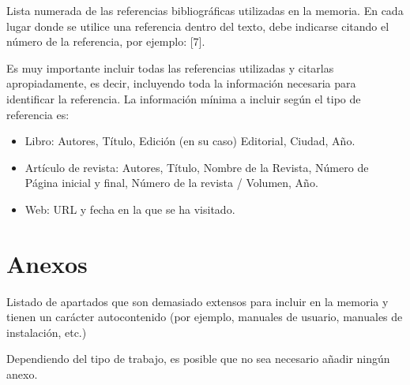 \documentclass{uoc_memoria}
\begin{document}
\begin{guidancebox}
Lista numerada de las referencias bibliográficas utilizadas en la memoria. En cada lugar donde se utilice una referencia dentro del texto, debe indicarse citando el número de la referencia, por ejemplo: [7].

Es muy importante incluir todas las referencias utilizadas y citarlas apropiadamente, es decir, incluyendo toda la información necesaria para identificar la referencia. La información mínima a incluir según el tipo de referencia es:

\begin{itemize}
  \item Libro: Autores, Título, Edición (en su caso) Editorial, Ciudad, Año.
  \item Artículo de revista: Autores, Título, Nombre de la Revista, Número de Página inicial y final, Número de la revista / Volumen, Año.
  \item Web: URL y fecha en la que se ha visitado.
\end{itemize}
\end{guidancebox}

\clearpage
\section{Anexos}

\begin{guidancebox}
Listado de apartados que son demasiado extensos para incluir en la memoria y tienen un carácter autocontenido (por ejemplo, manuales de usuario, manuales de instalación, etc.)

Dependiendo del tipo de trabajo, es posible que no sea necesario añadir ningún anexo.
\end{guidancebox}
\end{document}
